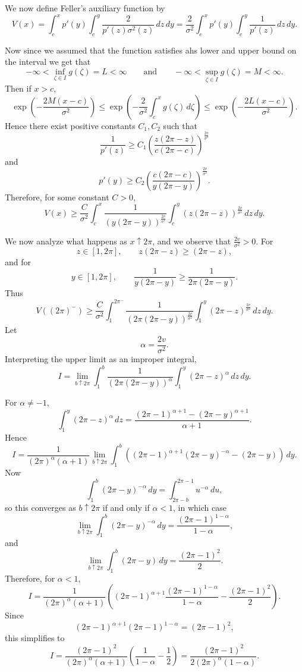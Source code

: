 \documentclass[11pt]{article}
\newcommand{\1}{\mathbbm{1}}
\theoremstyle{plain}
\theoremstyle{definition}
\theoremstyle{remark}
\begin{document}
We now define Feller's auxiliary function by
\[
V(x) = \int_c^x p'(y)\int_c^y \frac{2}{p'(z)\sigma^2(z)}\,dz\,dy
=
\frac{2}{\sigma^2}\int_c^x p'(y)\int_c^y \frac{1}{p'(z)}\,dz\,dy.
\]

Now since we assumed that the function satisfies ahs lower and upper bound on the interval we get that
\[
-\infty<\inf_{\zeta \in I} g(\zeta)=L<\infty
\qquad\text{and}\qquad
-\infty<\sup_{\zeta \in I} g(\zeta)=M<\infty.
\]
Then if $x>c$,
\[
 \exp\!\left(-\frac{2M(x-c)}{\sigma^2}\right)
 \leq
 \exp\!\left(-\frac{2}{\sigma^2}\int_c^x g(\zeta)\,d\zeta\right)
 \leq
 \exp\!\left(-\frac{2L(x-c)}{\sigma^2}\right).
\]
Hence there exist positive constants $C_1,C_2$ such that
\[
\frac{1}{p'(z)}
\geq
C_1 \left(\frac{z(2\pi-z)}{c(2\pi-c)}\right)^{\frac{2v}{\sigma^2}}
\]
and
\[
p'(y)
\geq
C_2 \left(\frac{c(2\pi-c)}{y(2\pi-y)}\right)^{\frac{2v}{\sigma^2}}.
\]
Therefore, for some constant $C>0$,
\[
V(x)\geq \frac{C}{\sigma^2} \int_c^x \frac{1}{\left(y(2\pi-y)\right)^{\frac{2v}{\sigma^2}}}\int_c^y \left(z(2\pi-z)\right)^{\frac{2v}{\sigma^2}}\,dz\,dy.
\]

We now analyze what happens as $x\uparrow 2\pi$, and we observe that $\frac{2v}{\sigma^2}>0$. For
\[
z \in [1, 2\pi], \qquad z(2\pi-z) \geq (2\pi-z),
\]
and for
\[
y \in [1, 2\pi], \qquad \frac{1}{y(2\pi-y)} \geq \frac{1}{2\pi(2\pi-y)}.
\]
Thus
\[
V((2\pi)^-)\geq  \frac{C}{\sigma^2} \int_1^{2\pi^-} \frac{1}{\left(2\pi(2\pi-y)\right)^{\frac{2v}{\sigma^2}}}\int_1^y \left(2\pi-z\right)^{\frac{2v}{\sigma^2}}\,dz\,dy.
\]
Let
\[
\alpha =\frac{2v}{\sigma^2}.
\]
Interpreting the upper limit as an improper integral,
\[
I=\lim_{b\uparrow 2\pi}\int_1^b \frac{1}{\left(2\pi(2\pi-y)\right)^{\alpha}}
\int_1^y (2\pi-z)^{\alpha}\,dz\,dy.
\]

For $\alpha\neq -1$,
\[
\int_1^y (2\pi-z)^{\alpha}\,dz
=
\frac{(2\pi-1)^{\alpha+1}-(2\pi-y)^{\alpha+1}}{\alpha+1}.
\]
Hence
\[
I
=
\frac{1}{(2\pi)^{\alpha}(\alpha+1)}
\lim_{b\uparrow 2\pi}
\int_1^b
\left(
(2\pi-1)^{\alpha+1}(2\pi-y)^{-\alpha}
-(2\pi-y)
\right)\,dy.
\]
Now
\[
\int_1^b (2\pi-y)^{-\alpha}\,dy
=
\int_{2\pi-b}^{2\pi-1} u^{-\alpha}\,du,
\]
so this converges as $b\uparrow 2\pi$ if and only if $\alpha<1$, in which case
\[
\lim_{b\uparrow 2\pi}\int_1^b (2\pi-y)^{-\alpha}\,dy
=
\frac{(2\pi-1)^{1-\alpha}}{1-\alpha},
\]
and
\[
\lim_{b\uparrow 2\pi}\int_1^b (2\pi-y)\,dy
=
\frac{(2\pi-1)^2}{2}.
\]
Therefore, for $\alpha<1$,
\[
I
=
\frac{1}{(2\pi)^{\alpha}(\alpha+1)}
\left(
(2\pi-1)^{\alpha+1}\frac{(2\pi-1)^{1-\alpha}}{1-\alpha}
-\frac{(2\pi-1)^2}{2}
\right).
\]
Since
\[
(2\pi-1)^{\alpha+1}(2\pi-1)^{1-\alpha}=(2\pi-1)^2,
\]
this simplifies to
\[
I
=
\frac{(2\pi-1)^2}{(2\pi)^{\alpha}(\alpha+1)}
\left(
\frac{1}{1-\alpha}-\frac12
\right)
=
\frac{(2\pi-1)^2}{2(2\pi)^{\alpha}(1-\alpha)}.
\]
\end{document}
